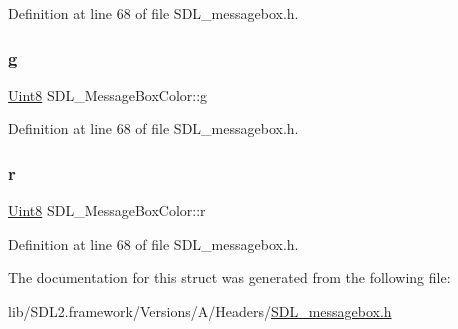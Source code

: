Definition at line 68 of file S\+D\+L\+\_\+messagebox.\+h.

\mbox{\label{struct_s_d_l___message_box_color_a5820adab0b32aa3eade101ea36ed6b4a}} 
\subsubsection{\texorpdfstring{g}{g}}
{\footnotesize\ttfamily \mbox{\hyperlink{_s_d_l__stdinc_8h_a2944638813a090aa23e62f4da842c3e2}{Uint8}} S\+D\+L\+\_\+\+Message\+Box\+Color\+::g}



Definition at line 68 of file S\+D\+L\+\_\+messagebox.\+h.

\mbox{\label{struct_s_d_l___message_box_color_a43ab2172c10058380fcf67ecc3f53184}} 
\subsubsection{\texorpdfstring{r}{r}}
{\footnotesize\ttfamily \mbox{\hyperlink{_s_d_l__stdinc_8h_a2944638813a090aa23e62f4da842c3e2}{Uint8}} S\+D\+L\+\_\+\+Message\+Box\+Color\+::r}



Definition at line 68 of file S\+D\+L\+\_\+messagebox.\+h.



The documentation for this struct was generated from the following file\+:\begin{DoxyCompactItemize}
\item 
lib/\+S\+D\+L2.\+framework/\+Versions/\+A/\+Headers/\mbox{\hyperlink{_s_d_l__messagebox_8h}{S\+D\+L\+\_\+messagebox.\+h}}\end{DoxyCompactItemize}
